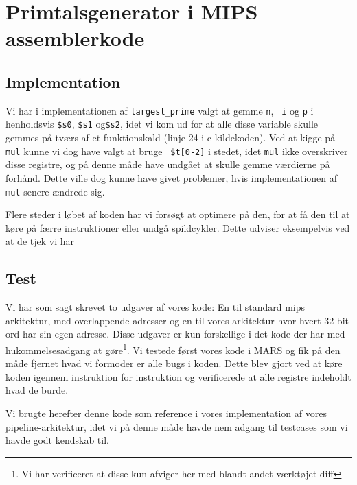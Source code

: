 \section{Primtalsgenerator i MIPS assemblerkode}
\subsection{Implementation}
Vi har i implementationen af {\tt largest\_prime} valgt at gemme {\tt n}, {\tt
i} og {\tt p} i henholdsvis {\tt \$s0}, {\tt \$s1} og{\tt \$s2}, idet vi kom ud
for at alle disse variable skulle gemmes på tværs af et funktionskald (linje 24
i c-kildekoden). Ved at kigge på {\tt mul} kunne vi dog have valgt at bruge {\tt
\$t[0-2]} i stedet, idet {\tt mul} ikke overskriver disse registre, og på denne
måde have undgået at skulle gemme værdierne på forhånd. Dette ville dog kunne
have givet problemer, hvis implementationen af {\tt mul} senere ændrede sig.

Flere steder i løbet af koden har vi forsøgt at optimere på den, for at få den
til at køre på færre instruktioner eller undgå spildcykler. Dette udviser eksempelvis
ved at de tjek vi har

\subsection{Test}
Vi har som sagt skrevet to udgaver af vores kode: En til standard mips
arkitektur, med overlappende adresser og en til vores arkitektur hvor hvert
32-bit ord har sin egen adresse. Disse udgaver er kun forskellige i det kode der
har med hukommelsesadgang at gøre\footnote{Vi har verificeret at disse kun
afviger her med blandt andet værktøjet diff}. Vi testede først vores kode i MARS
og fik på den måde fjernet hvad vi formoder er alle bugs i koden. Dette blev
gjort ved at køre koden igennem instruktion for instruktion og verificerede at
alle registre indeholdt hvad de burde.

Vi brugte herefter denne kode som reference i vores implementation af vores
pipeline-arkitektur, idet vi på denne måde havde nem adgang til testcases som vi
havde godt kendskab til.

